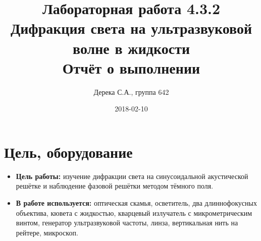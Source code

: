 \documentclass{article}
\title{Лабораторная работа 4.3.2\\ Дифракция света на ультразвуковой волне в жидкости\\ Отчёт о выполнении}
\date{2018-02-10}
\author{Дерека С.А., группа 642}
\begin{document}
\maketitle
{}
\newpage
{}

\section{Цель, оборудование}
\begin{itemize}
	\item \textbf{Цель работы:} изучение дифракции света на синусоидальной акустической решётке и наблюдение фазовой решётки методом тёмного поля.
	\item \textbf{В работе используется:} оптическая скамья, осветитель, два длиннофокусных объектива, кювета с жидкостью, кварцевый излучатель с микрометрическим винтом, генератор ультразвуковой частоты, линза, вертикальная нить на рейтере, микроскоп.
\end{itemize}
\end{document}
